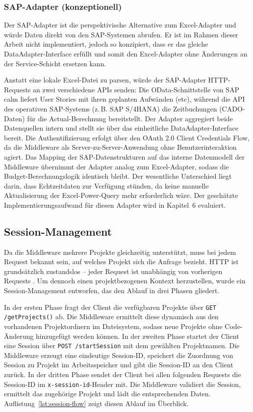 \subsubsection{SAP-Adapter (konzeptionell)}

Der SAP-Adapter ist die perspektivische Alternative zum Excel-Adapter und würde Daten direkt von den SAP-Systemen abrufen. Er ist im Rahmen dieser Arbeit nicht implementiert, jedoch so konzipiert, dass er das gleiche DataAdapter-Interface erfüllt und somit den Excel-Adapter ohne Änderungen an der Service-Schicht ersetzen kann.

Anstatt eine lokale Excel-Datei zu parsen, würde der SAP-Adapter HTTP-Requests an zwei verschiedene APIs senden: Die OData-Schnittstelle von SAP \gls{calm} liefert User Stories mit ihren geplanten Aufwänden (\gls{etc}), während die API des operativen SAP-Systems (z.\,B. SAP S/4HANA) die Zeitbuchungen (CADO-Daten) für die Actual-Berechnung bereitstellt. Der Adapter aggregiert beide Datenquellen intern und stellt sie über das einheitliche DataAdapter-Interface bereit. Die Authentifizierung erfolgt über den OAuth 2.0 Client Credentials Flow, da die Middleware als Server-zu-Server-Anwendung ohne Benutzerinteraktion agiert. Das Mapping der SAP-Datenstrukturen auf das interne Datenmodell der Middleware übernimmt der Adapter analog zum Excel-Adapter, sodass die Budget-Berechnungslogik identisch bleibt. Der wesentliche Unterschied liegt darin, dass Echtzeitdaten zur Verfügung stünden, da keine manuelle Aktualisierung der Excel-Power-Query mehr erforderlich wäre. Der geschätzte Implementierungsaufwand für diesen Adapter wird in Kapitel~6 evaluiert.

\subsection{Session-Management}

Da die Middleware mehrere Projekte gleichzeitig unterstützt, muss bei jedem Request bekannt sein, auf welches Projekt sich die Anfrage bezieht. HTTP ist grundsätzlich zustandslos -- jeder Request ist unabhängig von vorherigen Requests \citep{fielding2000}. Um dennoch einen projektbezogenen Kontext herzustellen, wurde ein Session-Management entworfen, das den Ablauf in drei Phasen gliedert.

In der ersten Phase fragt der Client die verfügbaren Projekte über \texttt{GET /getProjects()} ab. Die Middleware ermittelt diese dynamisch aus den vorhandenen Projektordnern im Dateisystem, sodass neue Projekte ohne Code-Änderung hinzugefügt werden können. In der zweiten Phase startet der Client eine Session über \texttt{POST /startSession} mit dem gewählten Projektnamen. Die Middleware erzeugt eine eindeutige Session-ID, speichert die Zuordnung von Session zu Projekt im Arbeitsspeicher und gibt die Session-ID an den Client zurück. In der dritten Phase sendet der Client bei allen folgenden Requests die Session-ID im \texttt{x-session-id}-Header mit. Die Middleware validiert die Session, ermittelt das zugehörige Projekt und lädt die entsprechenden Daten. Auflistung~\ref{lst:session-flow} zeigt diesen Ablauf im Überblick.

